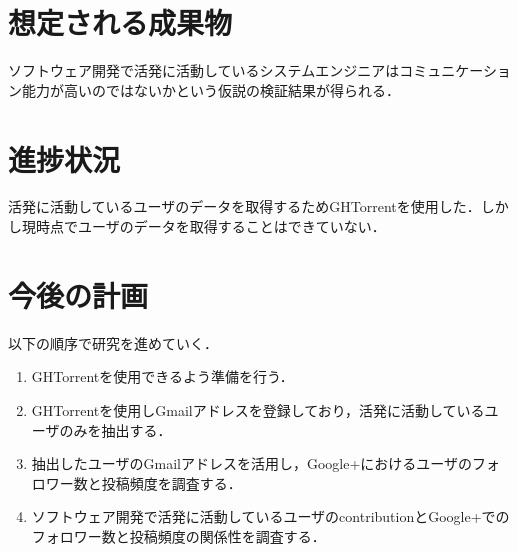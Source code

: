 \documentclass[uplatex,twocolumn,dvipdfmx]{jsarticle}
\begin{document}
\section{想定される成果物}

ソフトウェア開発で活発に活動しているシステムエンジニアはコミュニケーション能力が高いのではないかという仮説の検証結果が得られる．

\section{進捗状況}

活発に活動しているユーザのデータを取得するためGHTorrentを使用した．しかし現時点でユーザのデータを取得することはできていない．

\section{今後の計画}


以下の順序で研究を進めていく．

\begin{enumerate}
 \item GHTorrentを使用できるよう準備を行う．
 \item GHTorrentを使用しGmailアドレスを登録しており，活発に活動しているユーザのみを抽出する．
 \item 抽出したユーザのGmailアドレスを活用し，Google+におけるユーザのフォロワー数と投稿頻度を調査する．
 \item ソフトウェア開発で活発に活動しているユーザのcontributionとGoogle+でのフォロワー数と投稿頻度の関係性を調査する．
\end{enumerate}





\end{document}
